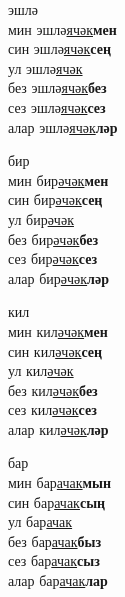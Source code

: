 \begin{multicols}{4}
\begin{enumerate}
\begin{minipage}{\linewidth}
    \item
    эшлә\\
    мин эшлә\underline{ячәк}\textbf{мен}\\
    син эшлә\underline{ячәк}\textbf{сең}\\
    ул эшлә\underline{ячәк}\\
    без эшлә\underline{ячәк}\textbf{без}\\
    сез эшлә\underline{ячәк}\textbf{сез}\\
    алар эшлә\underline{ячәк}\textbf{ләр}\\
\end{minipage}

\begin{minipage}{\linewidth}
    \item
    бир\\
    мин бир\underline{әчәк}\textbf{мен}\\
    син бир\underline{әчәк}\textbf{сең}\\
    ул бир\underline{әчәк}\\
    без бир\underline{әчәк}\textbf{без}\\
    сез бир\underline{әчәк}\textbf{сез}\\
    алар бир\underline{әчәк}\textbf{ләр}\\
\end{minipage}

\begin{minipage}{\linewidth}
    \item
    кил\\
    мин кил\underline{әчәк}\textbf{мен}\\
    син кил\underline{әчәк}\textbf{сең}\\
    ул кил\underline{әчәк}\\
    без кил\underline{әчәк}\textbf{без}\\
    сез кил\underline{әчәк}\textbf{сез}\\
    алар кил\underline{әчәк}\textbf{ләр}\\
\end{minipage}

\begin{minipage}{\linewidth}
    \item
    бар\\
    мин бар\underline{ачак}\textbf{мын}\\
    син бар\underline{ачак}\textbf{сың}\\
    ул бар\underline{ачак}\\
    без бар\underline{ачак}\textbf{быз}\\
    сез бар\underline{ачак}\textbf{сыз}\\
    алар бар\underline{ачак}\textbf{лар}\\
\end{minipage}


\end{enumerate}
\end{multicols}
